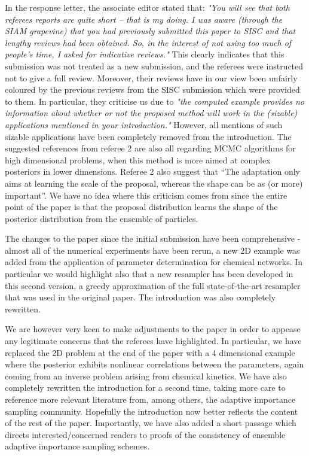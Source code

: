 \documentclass{letter}
\begin{document}
\begin{letter}{ }
In the response letter, the associate editor stated that: \emph{"You will see that both referees reports are quite short -- that is my doing. I was aware (through the SIAM grapevine) that you had previously submitted this paper to SISC and that lengthy reviews had been obtained. So, in the interest of not using too much of people's time, I asked for indicative reviews."} This clearly indicates that this submission was not treated as a new submission, and the referees were instructed not to give a full review. Moreover, their reviews have in our view been unfairly coloured by the previous reviews from the SISC submission which were provided to them. In particular, they criticise us due to \emph{"the computed example provides no information about whether or not the proposed method will work in the (sizable) applications mentioned in your introduction."} However, all mentions of such sizable applications have been completely removed from the introduction. The suggested references from referee 2 are also all regarding MCMC algorithms for high dimensional problems, when this method is more aimed at complex posteriors in lower dimensions. Referee 2 also suggest that ``The adaptation only aims at learning the scale of the proposal, whereas the shape can be as (or more) important''. We have no idea where this criticism comes from since the entire point of the paper is that the proposal distribution learns the shape of the posterior distribution from the ensemble of particles.

The changes to the paper since the initial submission have been comprehensive - almost all of the numerical experiments have been rerun, a new 2D example was added from the application of parameter determination for chemical networks. In particular we would highlight also that a new resampler has been developed in this second version, a greedy approximation of the full state-of-the-art resampler that was used in the original paper. The introduction was also completely rewritten.

We are however very keen to make adjustments to the paper in order to appease any legitimate concerns that the referees have highlighted. In particular, we have replaced the 2D problem at the end of the paper with a 4 dimensional example where the posterior exhibits nonlinear correlations between the parameters, again coming from an inverse problem arising from chemical kinetics. We have also completely rewritten the introduction for a second time, taking more care to reference more relevant literature from, among others, the adaptive importance sampling community. Hopefully the introduction now better reflects the content of the rest of the paper. Importantly, we have also added a short passage which directs interested/concerned readers to proofs of the consistency of ensemble adaptive importance sampling schemes.


\end{letter}
\end{document}
